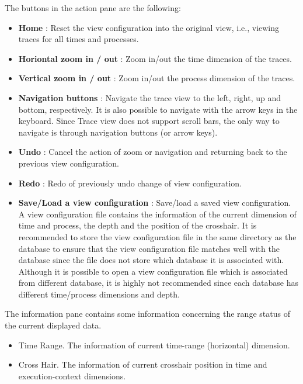\documentclass[english]{article}
\begin{document}
The buttons in the action pane are the following:
\begin{itemize}

	\item \textbf{Home} : Reset the view configuration into the original view, i.e., viewing traces for all times and processes.
	\item \textbf{Horiontal zoom in / out} : Zoom in/out the time dimension of the traces.
	\item \textbf{Vertical zoom in / out} : Zoom in/out the process dimension of the traces.
	\item \textbf{Navigation buttons} : Navigate the trace view to the left, right, up and bottom, respectively. It is also possible to navigate with the arrow keys in the keyboard. Since Trace view does not support scroll bars, the only way to navigate is through navigation buttons (or arrow keys).
	\item \textbf{Undo} : Cancel the action of zoom or navigation and returning back to the previous view configuration.
	\item \textbf{Redo} : Redo of previously undo change of view configuration.
	\item \textbf{Save/Load a view configuration} : Save/load a saved view configuration.
A view configuration file contains the information of the current dimension of time and process, the depth and the position of the crosshair.
It is recommended to store the view configuration file in the same directory as the database to ensure that the view configuration file matches well with the database since the file does not store which database it is associated with.
Although it is possible to open a view configuration file which is associated from different database, it is highly not recommended since each database has different time/process dimensions and depth.


\end{itemize}

The information pane contains some information concerning the range status of the current displayed data.
\begin{itemize}
 \item Time Range. The information of current time-range (horizontal) dimension.
 \item Cross Hair. The information of current crosshair position in time and execution-context dimensions.
\end{itemize}



\end{document}
